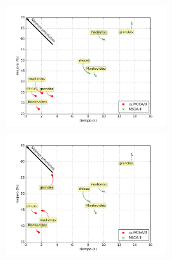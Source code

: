 \begin{columns}[t]
	\centering
		\includegraphics[width=6.075cm,height=4.725cm]{./evaluacion_experimental/tradeoff_maeb_mic/costo}\\
	\centering
		\includegraphics[width=6.075cm,height=4.725cm]{./evaluacion_experimental/tradeoff_maeb_mic/demora}
\end{columns}